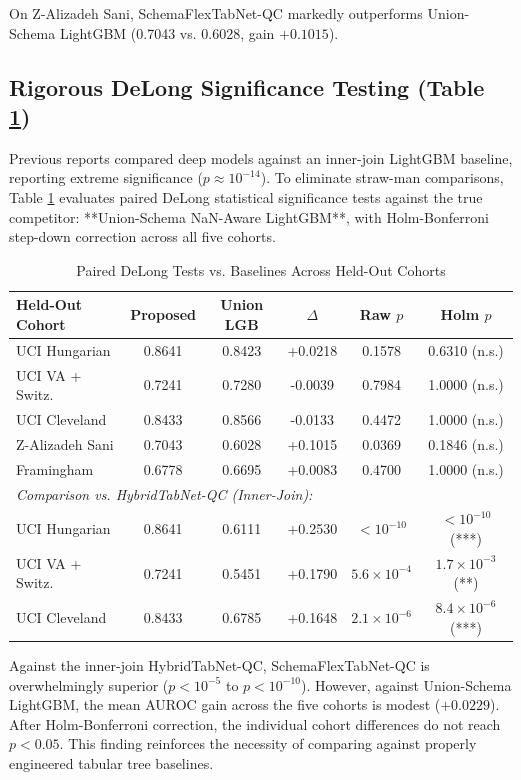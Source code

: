 \documentclass[journal]{IEEEtran}
\begin{document}
On Z-Alizadeh Sani, SchemaFlexTabNet-QC markedly outperforms Union-Schema LightGBM (0.7043 vs. 0.6028, gain $+0.1015$).

\subsection{Rigorous DeLong Significance Testing (Table \ref{tab:delong_tests})}
Previous reports compared deep models against an inner-join LightGBM baseline, reporting extreme significance ($p \approx 10^{-14}$). To eliminate straw-man comparisons, Table \ref{tab:delong_tests} evaluates paired DeLong statistical significance tests \cite{delong1988} against the true competitor: **Union-Schema NaN-Aware LightGBM**, with Holm-Bonferroni step-down correction across all five cohorts.

\begin{table}[t]
\caption{Paired DeLong Tests vs. Baselines Across Held-Out Cohorts}
\label{tab:delong_tests}
\centering
\begin{tabular}{lccccc}
\toprule
\textbf{Held-Out Cohort} & \textbf{Proposed} & \textbf{Union LGB} & \textbf{$\Delta$} & \textbf{Raw $p$} & \textbf{Holm $p$} \\
\midrule
UCI Hungarian    & 0.8641 & 0.8423 & +0.0218 & 0.1578 & 0.6310 (n.s.) \\
UCI VA + Switz.  & 0.7241 & 0.7280 & -0.0039 & 0.7984 & 1.0000 (n.s.) \\
UCI Cleveland    & 0.8433 & 0.8566 & -0.0133 & 0.4472 & 1.0000 (n.s.) \\
Z-Alizadeh Sani  & 0.7043 & 0.6028 & +0.1015 & 0.0369 & 0.1846 (n.s.) \\
Framingham       & 0.6778 & 0.6695 & +0.0083 & 0.4700 & 1.0000 (n.s.) \\
\midrule
\multicolumn{6}{l}{\textit{Comparison vs. HybridTabNet-QC (Inner-Join):}} \\
UCI Hungarian    & 0.8641 & 0.6111 & +0.2530 & $< 10^{-10}$ & $< 10^{-10}$ (***) \\
UCI VA + Switz.  & 0.7241 & 0.5451 & +0.1790 & $5.6 \times 10^{-4}$ & $1.7 \times 10^{-3}$ (**) \\
UCI Cleveland    & 0.8433 & 0.6785 & +0.1648 & $2.1 \times 10^{-6}$ & $8.4 \times 10^{-6}$ (***) \\
\bottomrule
\end{tabular}
\end{table}

Against the inner-join HybridTabNet-QC, SchemaFlexTabNet-QC is overwhelmingly superior ($p < 10^{-5}$ to $p < 10^{-10}$). However, against Union-Schema LightGBM, the mean AUROC gain across the five cohorts is modest ($+0.0229$). After Holm-Bonferroni correction, the individual cohort differences do not reach $p < 0.05$. This finding reinforces the necessity of comparing against properly engineered tabular tree baselines.
\end{document}
